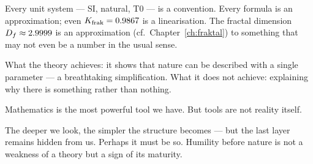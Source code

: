 Every unit system --- SI, natural, T0 --- is a convention. Every formula is an approximation; even $K_{\text{frak}} = 0.9867$ is a linearisation. The fractal dimension~$D_f \approx 2.9999$ is an approximation (cf.\ Chapter~\ref{ch:fraktal}) to something that may not even be a number in the usual sense.

What the theory achieves: it shows that nature can be described with a single parameter --- a breathtaking simplification. What it does not achieve: explaining why there is something rather than nothing.

Mathematics is the most powerful tool we have. But tools are not reality itself.

\begin{kerngedanke}
The deeper we look, the simpler the structure becomes --- but the last layer remains hidden from us. Perhaps it must be so. Humility before nature is not a weakness of a theory but a sign of its maturity.
\end{kerngedanke}
